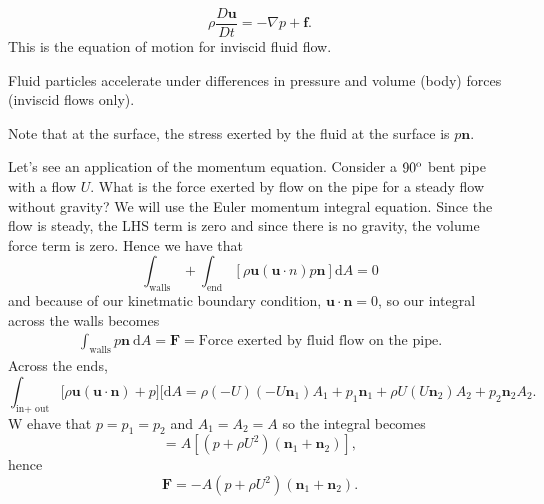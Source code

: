 \documentclass{article}
\begin{document}
\[
	\rho\frac{D\mathbf u}{D t} = -\nabla p+ \mathbf f.
\]
This is the equation of motion for inviscid fluid flow.\par
Fluid particles accelerate under differences in pressure and volume (body) forces (inviscid flows only).
\begin{remark}
  Note that at the surface, the stress exerted by the fluid at the surface is $ p\mathbf n $.
\end{remark}
Let's see an application of the momentum equation. Consider a $ 90^{\text o} $ bent pipe with a flow $ U $. What is the force exerted by flow on the pipe for a steady flow without gravity? We will use the Euler momentum integral equation. Since the flow is steady, the LHS term is  zero and since there is no gravity, the volume force term is zero. Hence we have that
\[
	\int_{\text{walls}} + \int_{\text{end}}[\rho \mathbf u (\mathbf u\cdot n ) p\mathbf n]\mathrm dA = 0
\]
and because of our kinetmatic boundary condition, $ \mathbf u\cdot\mathbf n = 0	$, so our integral across the walls becomes
\begin{align*}
	\int_{\text{walls}} p\mathbf n\ \mathrm d A =\mathbf F = \text{Force exerted by fluid flow on the pipe}.
\end{align*}
Across the ends,
\[
	\int_{\text{in} +\text{ out}} [\rho\mathbf u(\mathbf u\cdot\mathbf n)+p\mathbf ][\mathrm dA  = \rho(-U)(-U\mathbf n_1)A_1+p_1\mathbf n_1+\rho U(U\mathbf n_2) A_2 + p_2\mathbf n_2 A_2.
\]
W ehave that $ p=p_1=p_2 $ and $ A_1=A_2=A $ so the integral becomes
\[
	=A[(p+\rho U^2)(\mathbf n_1+\mathbf n_2)],
\]
hence
\[
  \mathbf F = -A(p+\rho U^2)(\mathbf n_1+\mathbf n_2).
\]
\end{document}

